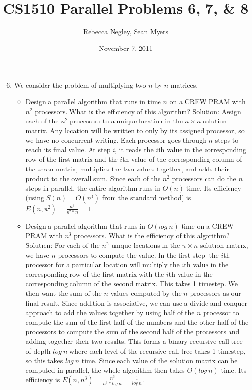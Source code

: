 \documentclass{article}
\title{CS1510  Parallel Problems 6, 7, \& 8}
\author{Rebecca Negley, Sean Myers}
\date{November 7, 2011}
\begin{document}
\maketitle

\begin{enumerate}
\setcounter{enumi}{5}
\item We consider the problem of multiplying two $n$ by $n$ matrices.
\begin{itemize}
\item Design a parallel algorithm that runs in time $n$ on a CREW PRAM with $n^2$ processors. What is the efficiency of this algorithm?
\newline
\newline Solution: Assign each of the $n^2$ processors to a unique location in the $n\times n$ solution matrix. Any location will be written to only by its assigned processor, so we have no concurrent writing. Each processor goes through $n$ steps to reach its final value. At step $i$, it reads the $i$th value in the corresponding row of the first matrix and the $i$th value of the corresponding column of the secon matrix, multiplies the two values together, and adds their product to the overall sum. Since each of the $n^2$ processors can do the $n$ steps in parallel, the entire algorithm runs in $O(n)$ time. Its efficiency (using $S(n)=O(n^3)$ from the standard method) is $E(n,n^2)=\frac{n^3}{n^2*n}=1$.
\newline
\item Design a parallel algorithm that runs in $O(log\ n)$ time on a CREW PRAM with $n^3$ processors. What is the efficiency of this algorithm?
\newline
\newline Solution: For each of the $n^2$ unique locations in the $n\times n$ solution matrix, we have $n$ processors to compute the value. In the first step, the $i$th processor for a particular location will multiply the $i$th value in the corresponding row of the first matrix with the $i$th value in the corresponding column of the second matrix. This takes 1 timestep. We then want the sum of the $n$ values computed by the $n$ processors as our final result. Since addition is associative, we can use a divide and conquer approach to add the values together by using half of the $n$ processor to compute the sum of the first half of the numbers and the other half of the processors to compute the sum of the second half of the processors and adding together their two results. This forms a binary recursive call tree of depth $log\ n$ where each level of the recursive call tree takes 1 timestep, so this takes $log\ n$ time. Since each value of the solution matrix can be computed in parallel, the whole algorithm then takes $O(log\ n)$ time. Its efficiency is $E(n,n^3)=\frac{n^3}{n^3*log\ n}=\frac{1}{log\ n}$.

\end{itemize}
\end{enumerate}
\end{document}
